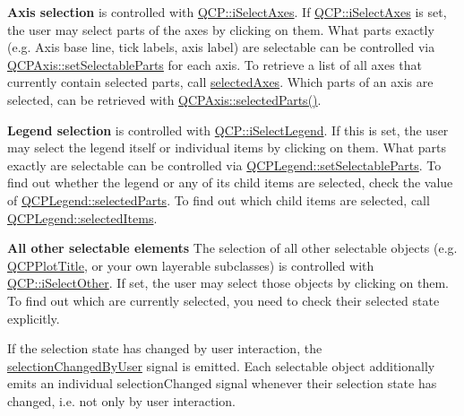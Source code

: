 {\bfseries Axis selection} is controlled with \hyperlink{namespace_q_c_p_a2ad6bb6281c7c2d593d4277b44c2b037ad6644ac55bef621645326e9dd7469caa}{Q\+C\+P\+::i\+Select\+Axes}. If \hyperlink{namespace_q_c_p_a2ad6bb6281c7c2d593d4277b44c2b037ad6644ac55bef621645326e9dd7469caa}{Q\+C\+P\+::i\+Select\+Axes} is set, the user may select parts of the axes by clicking on them. What parts exactly (e.\+g. Axis base line, tick labels, axis label) are selectable can be controlled via \hyperlink{class_q_c_p_axis_a513f9b9e326c505d9bec54880031b085}{Q\+C\+P\+Axis\+::set\+Selectable\+Parts} for each axis. To retrieve a list of all axes that currently contain selected parts, call \hyperlink{class_q_custom_plot_aa6baf867e8beb96ed5bd471f83ece903}{selected\+Axes}. Which parts of an axis are selected, can be retrieved with \hyperlink{class_q_c_p_axis_a08323248a1cba4750ef07ceea159e0b3}{Q\+C\+P\+Axis\+::selected\+Parts()}.

{\bfseries Legend selection} is controlled with \hyperlink{namespace_q_c_p_a2ad6bb6281c7c2d593d4277b44c2b037a269c9af298e257d1108edec0432b5513}{Q\+C\+P\+::i\+Select\+Legend}. If this is set, the user may select the legend itself or individual items by clicking on them. What parts exactly are selectable can be controlled via \hyperlink{class_q_c_p_legend_a9ce60aa8bbd89f62ae4fa83ac6c60110}{Q\+C\+P\+Legend\+::set\+Selectable\+Parts}. To find out whether the legend or any of its child items are selected, check the value of \hyperlink{class_q_c_p_legend_abbbf1b2d6a149013527ed87b0780894a}{Q\+C\+P\+Legend\+::selected\+Parts}. To find out which child items are selected, call \hyperlink{class_q_c_p_legend_ac93eaf236e911d67aa8b88942ef45c5e}{Q\+C\+P\+Legend\+::selected\+Items}.

{\bfseries All other selectable elements} The selection of all other selectable objects (e.\+g. \hyperlink{class_q_c_p_plot_title}{Q\+C\+P\+Plot\+Title}, or your own layerable subclasses) is controlled with \hyperlink{namespace_q_c_p_a2ad6bb6281c7c2d593d4277b44c2b037af67a50bc26147a13b551b3a625374949}{Q\+C\+P\+::i\+Select\+Other}. If set, the user may select those objects by clicking on them. To find out which are currently selected, you need to check their selected state explicitly.

If the selection state has changed by user interaction, the \hyperlink{class_q_custom_plot_a500c64a109bc773c973ad274f2fa4190}{selection\+Changed\+By\+User} signal is emitted. Each selectable object additionally emits an individual selection\+Changed signal whenever their selection state has changed, i.\+e. not only by user interaction.


